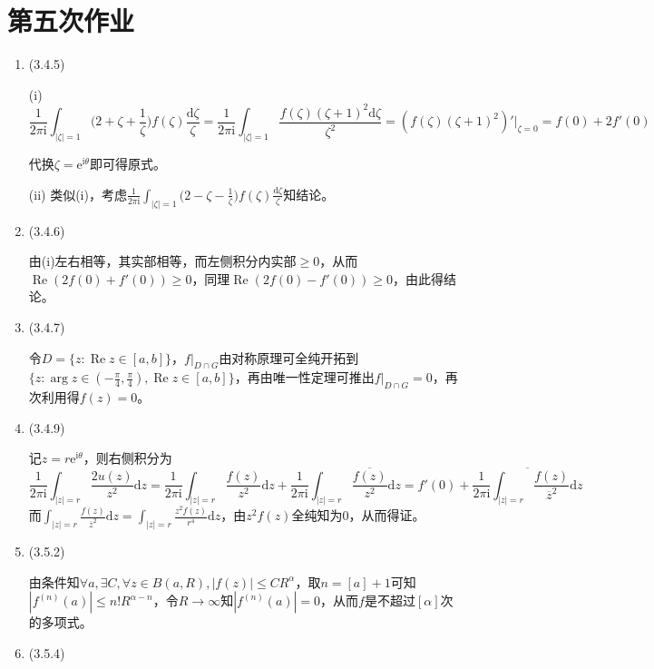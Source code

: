 \documentclass[a4paper,UTF8,fontset=windows]{ctexart}
\DeclareMathOperator{\re}{Re}
\begin{document}
\section{第五次作业}
\begin{enumerate}
    \item (3.4.5)
    
    (i)
    \[\frac{1}{2\pi\mathrm{i}}\int_{|\zeta|=1}\bigg(2+\zeta+\frac{1}{\zeta}\bigg)f(\zeta)\frac{\mathrm{d}\zeta}{\zeta}=\frac{1}{2\pi\mathrm{i}}\int_{|\zeta|=1}\frac{f(\zeta)(\zeta+1)^2\mathrm{d}\zeta}{\zeta^2}=(f(\zeta)(\zeta+1)^2)'|_{\zeta=0}=f(0)+2f'(0)\]
    
    代换$\zeta=\mathrm{e}^{\mathrm{i}\theta}$即可得原式。
    
    (ii) 类似(i)，考虑$\displaystyle\frac{1}{2\pi\mathrm{i}}\int_{|\zeta|=1}\bigg(2-\zeta-\frac{1}{\zeta}\bigg)f(\zeta)\frac{\mathrm{d}\zeta}{\zeta}$知结论。
    
    \item (3.4.6)
    
    由(i)左右相等，其实部相等，而左侧积分内实部$\ge0$，从而$\re(2f(0)+f'(0))\ge0$，同理$\re(2f(0)-f'(0))\ge0$，由此得结论。
    
    \item (3.4.7)
    
    令$D=\{z:\re z\in[a,b]\}$，$f|_{D\cap G}$由对称原理可全纯开拓到$\{z:\arg z\in(-\frac{\pi}{4},\frac{\pi}{4}),\re z\in[a,b]\}$，再由唯一性定理可推出$f|_{D\cap G}=0$，再次利用得$f(z)=0$。
    
    \item (3.4.9)
    
    记$z=r\mathrm{e}^{\mathrm{i}\theta}$，则右侧积分为
    \[\frac{1}{2\pi\mathrm{i}}\int_{|z|=r}\frac{2u(z)}{z^2}\mathrm{d}z=\frac{1}{2\pi\mathrm{i}}\int_{|z|=r}\frac{f(z)}{z^2}\mathrm{d}z+\frac{1}{2\pi\mathrm{i}}\int_{|z|=r}\frac{\overline{f(z)}}{z^2}\mathrm{d}z=f'(0)+\overline{\frac{1}{2\pi\mathrm{i}}\int_{|z|=r}\frac{f(z)}{\overline{z}^2}\mathrm{d}z}\]
    而$\int_{|z|=r}\frac{f(z)}{\overline{z}^2}\mathrm{d}z=\int_{|z|=r}\frac{z^2f(z)}{r^4}\mathrm{d}z$，由$z^2f(z)$全纯知为0，从而得证。
    
    \item (3.5.2)
    
    由条件知$\forall a,\exists C, \forall z\in B(a,R), |f(z)|\le CR^\alpha$，取$n=[a]+1$可知$|f^{(n)}(a)|\le n!R^{\alpha-n}$，令$R\to\infty$知$|f^{(n)}(a)|=0$，从而$f$是不超过$[\alpha]$次的多项式。
    
    \item (3.5.4)
    

\end{enumerate}
\end{document}
